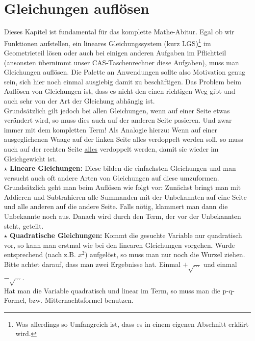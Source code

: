 \section{Gleichungen auflösen}
	Dieses Kapitel ist fundamental für das komplette Mathe-Abitur. Egal ob wir
	Funktionen aufstellen, ein lineares Gleichungssystem (kurz LGS)\footnote{Was
	allerdings so Umfangreich ist, dass es in einem eigenen Abschnitt erklärt
	wird.} im Geometrieteil lösen oder auch bei einigen anderen Aufgaben im Pflichtteil
	(ansonsten übernimmt unser CAS-Taschenrechner diese Aufgaben), muss man
	Gleichungen auflösen. Die Palette an Anwendungen sollte also Motivation genug
	sein, sich hier noch einmal ausgiebig damit zu beschäftigen. Das Problem beim
	Auflösen von Gleichungen ist, dass es nicht den einen richtigen Weg gibt und
	auch sehr von der Art der Gleichung abhängig ist.\\
	Grundsätzlich gilt jedoch bei allen Gleichungen, wenn auf einer Seite etwas
	verändert wird, so muss dies auch auf der anderen Seite pasieren. Und zwar
	immer mit dem kompletten Term! Als Analogie hierzu: Wenn auf einer
	ausgeglichenen Waage auf der linken Seite alles verdoppelt werden soll, so muss
	auch auf der rechten Seite \underline{alles} verdoppelt werden, damit sie
	wieder im Gleichgewicht ist.\\
	
	\(\star\) \textbf{Lineare Gleichungen: } Diese bilden die einfachsten
	Gleichungen und man versucht auch oft andere Arten von Gleichungen auf diese
	umzuformen. Grundsätzlich geht man beim Auflösen wie folgt vor: Zunächst bringt
	man mit Addieren und Subtrahieren alle Summanden mit der Unbekannten auf eine
	Seite und alle anderen auf die andere Seite. Falls nötig, klammert man dann die
	Unbekannte noch aus. Danach wird durch den Term, der vor der Unbekannten steht,
	geteilt.\\
	
	\(\star\) \textbf{Quadratische Gleichungen: } Kommt die gesuchte Variable nur
	quadratisch vor, so kann man erstmal wie bei den linearen Gleichungen vorgehen.
	Wurde entsprechend (nach z.B. \(x^2\)) aufgelöst, so muss man nur noch die
	Wurzel ziehen. Bitte achtet darauf, dass man zwei Ergebnisse hat. Einmal
	\(+\sqrt{\ldots}\) und einmal \(-\sqrt{\ldots}\).\\
	Hat man die Variable quadratisch und linear im Term, so muss man die
	p-q-Formel, bzw. Mitternachtsformel benutzen.\\
	
